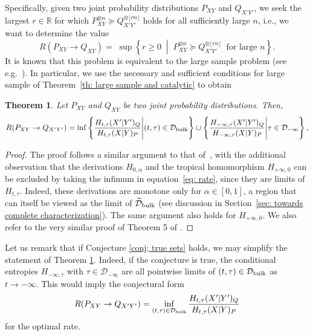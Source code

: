 \documentclass[aps,pra,11pt,onecolumn,nofootinbib,tightenlines]{revtex4-2}
\newtheorem{theorem}{Theorem}[section]
\theoremstyle{definition}
\newcommand{\D}{\mathcal{D}}
\newcommand{\mc}[1]{\mathcal{#1}}
\begin{document}
Specifically, given two joint probability distributions $P_{XY}$ and $Q_{X'Y'}$, we seek the largest $r \in \mathbb{R}$ for which $P_{XY}^{\otimes n} \succeq Q_{X'Y'}^{\otimes \lfloor r n \rfloor}$ holds for all sufficiently large $n$, i.e., we want to determine the value
\begin{equation}
    R(P_{XY} \rightarrow Q_{XY}) =\; \sup\left\{ r \ge 0 \;\middle|\; P_{XY}^{\otimes n}\succeq Q_{X'Y'}^{\otimes \lfloor rn \rfloor} \;\; \text{for large } n \right\}.
\end{equation}
It is known that this problem is equivalent to the large sample problem (see e.g.~\cite[Theorem 3.11]{Jensen_Kjaerulf_2019}). In particular, we use the necessary and sufficient conditions for large sample of Theorem~\ref{th: large sample and catalytic} to obtain
\begin{theorem}
\label{thm: rate}
    Let $P_{XY}$ and $Q_{XY}$ be two joint probability distributions. Then, 
    \begin{equation}
    \label{eq: rate}
R(P_{XY}\rightarrow Q_{X'Y'}) = \inf\left\{ \frac{H_{t,\tau}(X'|Y')_Q}{H_{t,\tau}(X|Y)_P}\Bigg| (t,\tau) \in \D_{\rm{bulk}}\right\} \cup \left\{ \frac{H_{-\infty,\tau}(X'|Y')_Q}{H_{-\infty,\tau}(X|Y)_P}\Bigg| \tau \in \D_{-\infty}\right\},
\end{equation}
\end{theorem}
\begin{proof}
   The proof follows a similar argument to that of~\cite[Theorem 3.11]{Jensen_Kjaerulf_2019}, with the additional observation that the derivations $H_{0,\alpha}$ and the tropical homomorphism $H_{+\infty,0}$ can be excluded by taking the infimum in equation~\eqref{eq: rate}, since they are limits of $H_{t,\tau}$. Indeed, these derivations are monotone only for $\alpha \in [0,1]$, a region that can itself be viewed as the limit of $\widetilde{\D}_{\rm bulk}$ (see discussion in Section~\ref{sec: towards complete characterization}). The same argument also holds for $H_{+\infty,0}$. We also refer to the very similar proof of Theorem 5 of \cite{verhagen2025}.
\end{proof}

Let us remark that if Conjecture \ref{conj; true sets} holds, we may simplify the statement of Theorem \ref{thm: rate}. Indeed, if the conjecture is true, the conditional entropies $H_{-\infty,\tau}$ with $\tau\in\mc D_{-\infty}$ are all pointwise limits of $(t,\tau)\in\mc D_{\rm bulk}$ as $t\to-\infty$. This would imply the conjectural form
\begin{equation}
R(P_{XY}\rightarrow Q_{X'Y'})=\inf_{(t,\tau)\in\mc D_{\rm bulk}}\frac{H_{t,\tau}(X'|Y')_Q}{H_{t,\tau}(X|Y)_P}
\end{equation}
for the optimal rate.
\end{document}
